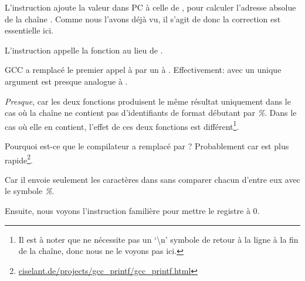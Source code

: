 L'instruction  ajoute la valeur dans \ac{PC} à celle de
, pour calculer l'adresse absolue de la chaîne .
Comme nous l'avons déjà vu, il s'agit de \q{\PICcode} donc la correction
est essentielle ici.

L'instruction  appelle la fonction \puts au lieu de \printf.

\label{puts}

GCC a remplacé le premier appel à \printf par un à \puts.
Effectivement: \printf avec un unique argument est presque analogue à \puts.

\emph{Presque}, car les deux fonctions produisent le même résultat uniquement dans
le cas où la chaîne ne contient pas d'identifiants de format débutant par \emph{\%}.
Dans le cas où elle en contient, l'effet de ces deux fonctions est différent\footnote{Il
est à noter que \puts ne nécessite pas un `\textbackslash{}n'
symbole de retour à la ligne à la fin de la chaîne, donc nous ne le voyons pas ici.}.

Pourquoi est-ce que le compilateur a remplacé \printf par \puts? Probablement car
\puts est plus
rapide\footnote{\href{http://go.yurichev.com/17063}{ciselant.de/projects/gcc\_printf/gcc\_printf.html}}. 

Car il envoie seulement les caractères dans 
sans comparer chacun d'entre eux avec le symbole \emph{\%}.

Ensuite, nous voyons l'instruction familière  pour mettre le
registre  à 0.
